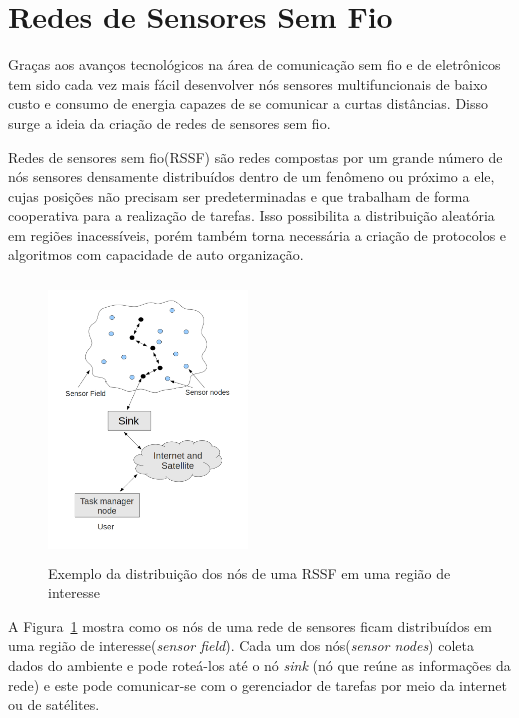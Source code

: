 \section{Redes de Sensores Sem Fio}

Graças aos avanços tecnológicos na área de comunicação sem fio e de eletrônicos tem sido cada vez mais fácil desenvolver nós sensores multifuncionais de baixo custo e consumo de energia capazes de se comunicar a curtas distâncias. Disso surge a ideia da criação de redes de sensores sem fio.

Redes de sensores sem fio(RSSF) são redes compostas por um grande número de nós sensores densamente distribuídos dentro de um fenômeno ou próximo a ele, cujas posições não precisam ser predeterminadas e que trabalham de forma cooperativa para a realização de tarefas. Isso possibilita a distribuição aleatória em regiões inacessíveis, porém também torna necessária a criação de protocolos e algoritmos com capacidade de auto organização\cite{Akyildiz2002}.

\begin{figure}[!htb]
\centering
\includegraphics[width=200px,height=280px]{./Pictures/SensorNodesScatteredInASensorField.png}
\caption{Exemplo da distribuição dos nós de uma RSSF em uma região de interesse} %
\label{fig:snsf} %
\end{figure}

A Figura~\ref{fig:snsf} mostra como os nós de uma rede de sensores ficam distribuídos em uma região de interesse(\textit{sensor field}). Cada um dos nós(\textit{sensor nodes}) coleta dados do ambiente e pode roteá-los até o nó \textit{sink} (nó que reúne as informações da rede) e este pode comunicar-se com o gerenciador de tarefas por meio da internet ou de satélites.

